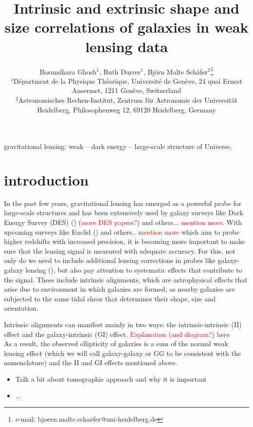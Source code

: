 \documentclass[a4paper,fleqn,usenatbib]{mnras}
\title[intrinsic size correlations]
{Intrinsic and extrinsic shape and size correlations of galaxies in weak lensing data}
\author[B. Ghosh, R. Durrer, B.M. Sch{\"a}fer]
{Basundhara Ghosh$^1$, Ruth Durrer$^1$, Bj{\"o}rn Malte Sch{\"a}fer$^2$\thanks{e-mail: bjoern.malte.schaefer@uni-heidelberg.de}\\
$^1$D{\'e}partment de la Physique Th{\'e}orique, Universit{\'e} de Gen{\`e}ve, 24 quai Ernest Ansermet, 1211 Gen{\`e}ve, Switzerland\\
$^2$Astronomisches Rechen-Institut, Zentrum f{\"u}r Astronomie der Universit{\"a}t Heidelberg, Philosophenweg 12, 69120 Heidelberg, Germany
}
\newcommand\BG[1]{\textcolor{red}{#1}}
\begin{document}
\pagerange{\pageref{firstpage}--\pageref{lastpage}}
\maketitle
\label{firstpage}


\begin{abstract}

\end{abstract}


\begin{keywords}
gravitational lensing: weak -- dark energy -- large-scale structure of Universe.
\end{keywords}


\section{introduction}\label{sect_intro}
In the past few years, gravitational lensing has emerged as a powerful probe for large-scale structures and has been extensively used by galaxy surveys like Dark Energy Survey (DES) (\cite{Abbott:2017wau}) (\BG{more DES papers?}) and others... \BG{mention more}. With upcoming surveys like Euclid (\cite{Amendola:2016saw}) and others.. \BG{mention more} which aim to probe higher redshifts with increased precision, it is becoming more important to make sure that the lensing signal is measured with adequate accuracy. For this, not only do we need to include additional lensing corrections in probes like galaxy-galaxy lensing (\cite{Ghosh:2018nsm}), but also pay attention to systematic effects that contribute to the signal. These include intrinsic alignments, which are astrophysical effects that arise due to environment in which galaxies are formed, as nearby galaxies are subjected to the same tidal shear that determines their shape, size and orientation.\par
Intrinsic alignments can manifest mainly in two ways: the intrinsic-intrinsic (II) effect and the galaxy-intrinsic (GI) effect. \BG{Explanation (and diagram?) here}\\
As a result, the observed ellipticity of galaxies is a sum of the normal weak lensing effect (which we will call galaxy-galaxy or GG to be consistent with the nomenclature) and the II and GI effects mentioned above.
\begin{itemize}
    \item Talk a bit about tomographic approach and why it is important
    \item ...
\end{itemize}
\end{document}
